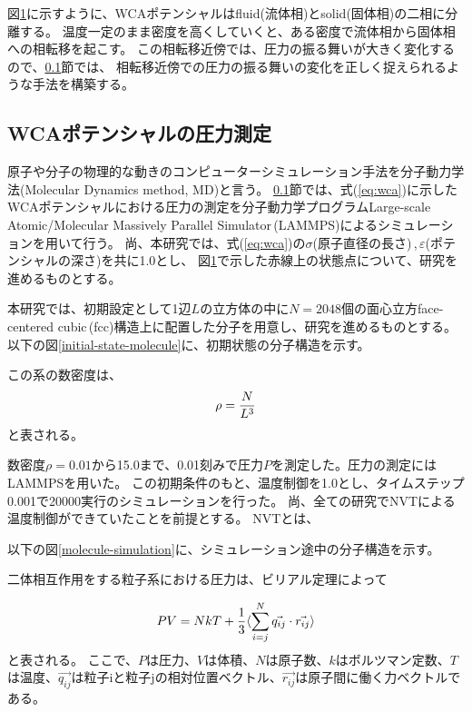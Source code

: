 \documentclass[titlepage]{jsreport}
\begin{document}
{{{\begin{figure}[htbp]
    \label{fig:wca-phase-diagram}
\end{figure}

図\ref{fig:wca-phase-diagram}に示すように、WCAポテンシャルはfluid(流体相)とsolid(固体相)の二相に分離する。
温度一定のまま密度を高くしていくと、ある密度で流体相から固体相への相転移を起こす。
この相転移近傍では、圧力の振る舞いが大きく変化するので、\ref{method-subsec:WCA-pressure}節では、
相転移近傍での圧力の振る舞いの変化を正しく捉えられるような手法を構築する。


\subsection{WCAポテンシャルの圧力測定}\label{method-subsec:WCA-pressure}
原子や分子の物理的な動きのコンピューターシミュレーション手法を分子動力学法(Molecular Dynamics method, MD)と言う\cite{molecular-dynamics}。
\ref{method-subsec:WCA-pressure}節では、式(\ref{eq:wca})に示したWCAポテンシャルにおける圧力の測定を分子動力学プログラムLarge-scale Atomic/Molecular Massively Parallel Simulator\,(LAMMPS)\cite{lammps}によるシミュレーションを用いて行う。
尚、本研究では、式(\ref{eq:wca})の${\sigma}$(原子直径の長さ)\,,\,${\varepsilon}$(ポテンシャルの深さ)を共に1.0とし、
図\ref{fig:wca-phase-diagram}で示した赤線上の状態点について、研究を進めるものとする。


本研究では、初期設定として1辺$L$の立方体の中に$N=2048$個の面心立方face-centered cubic\,(fcc)構造上に配置した分子を用意し、研究を進めるものとする。
以下の図\ref{initial-state-molecule}に、初期状態の分子構造を示す。

この系の数密度は、
\large
\begin{equation}
\rho = {\frac{N}{L^3}}{\label{eq:density}}
\end{equation}
\normalsize
と表される。

数密度$\rho=0.01$から15.0まで、0.01刻みで圧力$P$を測定した。圧力の測定にはLAMMPSを用いた。
この初期条件のもと、温度制御を1.0とし、タイムステップ0.001で20000実行のシミュレーションを行った。
尚、全ての研究でNVTによる温度制御ができていたことを前提とする。
NVTとは、

以下の図\ref{molecule-simulation}に、シミュレーション途中の分子構造を示す。


二体相互作用をする粒子系における圧力は、ビリアル定理によって

\large
\begin{equation}
PV=NkT+{\frac{1}{3}}\langle\sum_{i=j}^N\vec{q_{ij}} \cdot \vec{r_{ij}}\rangle{\label{eq:Theoritical-pressure}}
\end{equation}
\normalsize
と表される\cite{Theoritical-pressure,virial-therom}。
ここで、$P$は圧力、$V$は体積、$N$は原子数、$k$はボルツマン定数、$T$は温度、$\vec{q_{ij}}$は粒子iと粒子jの相対位置ベクトル、$\vec{r_{ij}}$は原子間に働く力ベクトルである。

}}}
\end{document}
